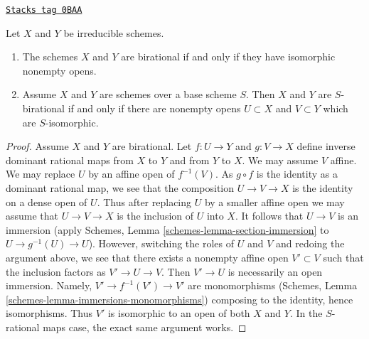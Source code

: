 \begin{lemma}
\label{morphisms-lemma-birational-integral}
\href{https://stacks.math.columbia.edu/tag/0BAA}{\texttt{Stacks tag 0BAA}}

Let $X$ and $Y$ be irreducible schemes.
\begin{enumerate}
\item The schemes $X$ and $Y$ are birational if and only if they have
isomorphic nonempty opens.
\item Assume $X$ and $Y$ are schemes over a base scheme $S$. Then
$X$ and $Y$ are $S$-birational if and only if there are nonempty
opens $U \subset X$ and $V \subset Y$ which are $S$-isomorphic.
\end{enumerate}
\end{lemma}

\begin{proof}
Assume $X$ and $Y$ are birational. Let $f : U \to Y$ and $g : V \to X$
define inverse dominant rational maps from $X$ to $Y$ and from $Y$ to $X$.
We may assume $V$ affine. We may replace $U$ by an affine open of $f^{-1}(V)$.
As $g \circ f$ is the identity as a dominant rational map, we see that
the composition $U \to V \to X$ is the identity on a dense open of $U$.
Thus after replacing $U$ by a smaller affine open we may assume that
$U \to V \to X$ is the inclusion of $U$ into $X$. It follows that
$U \to V$ is an immersion
(apply Schemes, Lemma \ref{schemes-lemma-section-immersion}
to $U \to g^{-1}(U) \to U$).
However, switching the roles of $U$ and $V$ and redoing the argument
above, we see that there exists a nonempty affine open $V' \subset V$
such that the inclusion factors as $V' \to U \to V$. Then $V' \to U$ is
necessarily an open immersion. Namely, $V' \to f^{-1}(V') \to V'$ are
monomorphisms
(Schemes, Lemma \ref{schemes-lemma-immersions-monomorphisms})
composing to the identity, hence isomorphisms.
Thus $V'$ is isomorphic to an open of both $X$ and $Y$.
In the $S$-rational maps case, the exact same argument works.
\end{proof}

